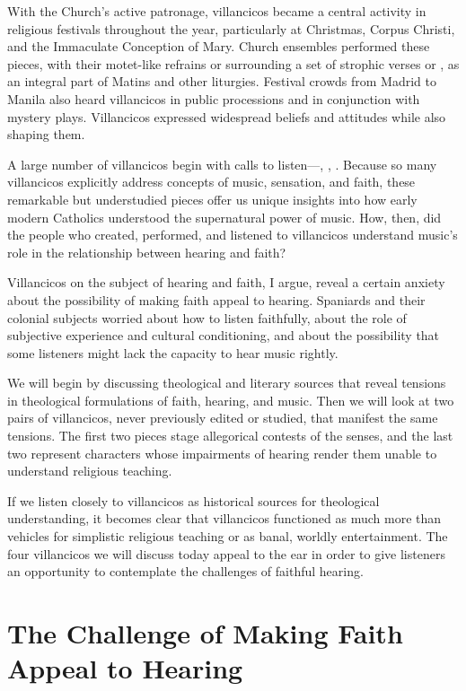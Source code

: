With the Church's active patronage, villancicos became a central activity in religious festivals throughout the year, particularly at Christmas, Corpus Christi, and the Immaculate Conception of Mary.
Church ensembles performed these pieces, with their motet-like refrains or  surrounding a set of strophic verses or , as an integral part of Matins and other liturgies.
Festival crowds from Madrid to Manila also heard villancicos in public processions and in conjunction with mystery plays.
Villancicos expressed widespread beliefs and attitudes while also shaping them.

A large number of villancicos begin with calls to listen---, , .
Because so many villancicos explicitly address concepts of music, sensation, and faith, these remarkable but understudied pieces offer us unique insights into how early modern Catholics understood the supernatural power of music.
How, then, did the people who created, performed, and listened to villancicos understand music's role in the relationship between hearing and faith?

Villancicos on the subject of hearing and faith, I argue, reveal a certain anxiety about the possibility of making faith appeal to hearing.
Spaniards and their colonial subjects worried about how to listen faithfully, about the role of subjective experience and cultural conditioning, and about the possibility that some listeners might lack the capacity to hear music rightly.

We will begin by discussing theological and literary sources that reveal tensions in theological formulations of faith, hearing, and music.
Then we will look at two pairs of villancicos, never previously edited or studied, that manifest the same tensions.
The first two pieces stage allegorical contests of the senses, and the last two represent characters whose impairments of hearing render them unable to understand religious teaching.

If we listen closely to villancicos as historical sources for theological understanding, it becomes clear that villancicos functioned as much more than vehicles for simplistic religious teaching or as banal, worldly entertainment.
The four villancicos we will discuss today appeal to the ear in order to give listeners an opportunity to contemplate the challenges of faithful hearing.

\section{The Challenge of Making Faith Appeal to Hearing}

